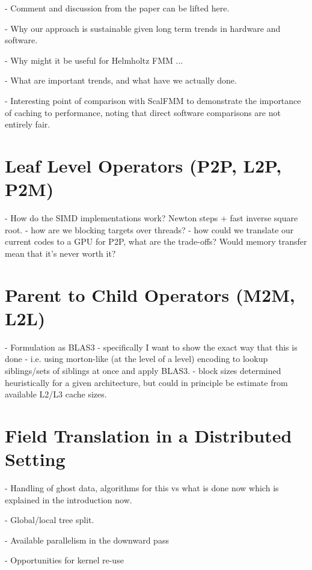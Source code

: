 - Comment and discussion from the paper can be lifted here.

- Why our approach is sustainable given long term trends in hardware and software.

- Why might it be useful for Helmholtz FMM ...

- What are important trends, and what have we actually done.

- Interesting point of comparison with ScalFMM to demonstrate the importance of caching to performance, noting that direct software comparisons are not entirely fair.


\section{Leaf Level Operators (P2P, L2P, P2M)}

- How do the SIMD implementations work? Newton steps + fast inverse square root.
- how are we blocking targets over threads?
- how could we translate our current codes to a GPU for P2P, what are the trade-offs? Would memory transfer mean that it's never worth it?

\section{Parent to Child Operators (M2M, L2L)}

- Formulation as BLAS3
    - specifically I want to show the exact way that this is done
    - i.e. using morton-like (at the level of a level) encoding to lookup siblings/sets of siblings at once and apply BLAS3.
    - block sizes determined heuristically for a given architecture, but could in principle be estimate from available L2/L3 cache sizes.

\section{Field Translation in a Distributed Setting}

- Handling of ghost data, algorithms for this vs what is done now which is explained in the introduction now.

- Global/local tree split.

- Available parallelism in the downward pass

- Opportunities for kernel re-use
